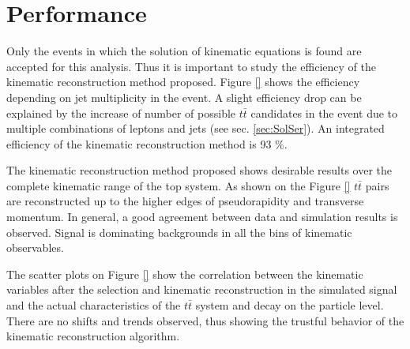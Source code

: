\section{Performance}\label{sec:kinRecPerf}

Only the events in which the solution of kinematic equations is found are accepted for this analysis. Thus it is important to study the efficiency
of the kinematic reconstruction method proposed. Figure \ref{} shows the efficiency depending on jet multiplicity in the event. A slight efficiency
drop can be explained by the increase of number of possible $t\bar{t}$ candidates in the event due to multiple combinations of leptons and jets
(see sec. \ref{sec:SolSer}). An integrated efficiency of the kinematic reconstruction method is 93 $\%$.

The kinematic reconstruction method proposed shows desirable results over the complete kinematic range of the top system. As shown on the Figure \ref{} 
$t\bar{t}$ pairs are reconstructed up to the higher edges of pseudorapidity and transverse momentum. In general, a good agreement between data and
simulation results is observed. Signal is dominating backgrounds in all the bins of kinematic observables.

The scatter plots on Figure \ref{} show the correlation between the kinematic variables after the selection and kinematic reconstruction in the simulated
signal and the actual characteristics of the $t\bar{t}$ system and decay on the particle level. There are no shifts and trends observed, thus showing 
the trustful behavior of the kinematic reconstruction algorithm.

